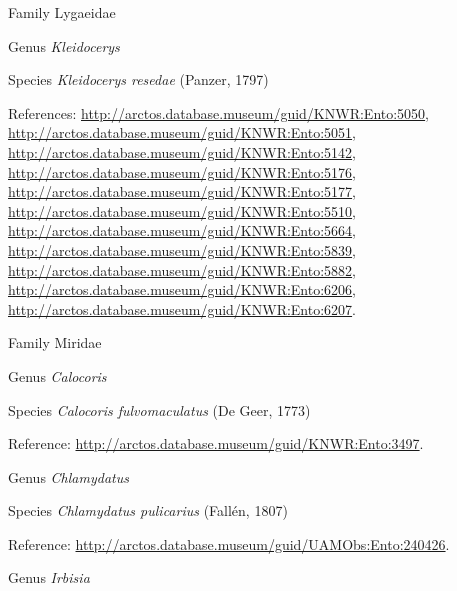 \documentclass[9pt, article]{memoir}
\begin{document}
\begin{multicols}{2}
\vspace{6pt}\noindent\hspace{24pt}Family Lygaeidae


\vspace{6pt}\noindent\hspace{30pt}Genus \textit{Kleidocerys}


\vspace{6pt}\noindent\hspace{36pt}Species \textit{Kleidocerys resedae} (Panzer, 1797)


\vspace{6pt}References: 
\url{http://arctos.database.museum/guid/KNWR:Ento:5050}, 
\url{http://arctos.database.museum/guid/KNWR:Ento:5051}, 
\url{http://arctos.database.museum/guid/KNWR:Ento:5142}, 
\url{http://arctos.database.museum/guid/KNWR:Ento:5176}, 
\url{http://arctos.database.museum/guid/KNWR:Ento:5177}, 
\url{http://arctos.database.museum/guid/KNWR:Ento:5510}, 
\url{http://arctos.database.museum/guid/KNWR:Ento:5664}, 
\url{http://arctos.database.museum/guid/KNWR:Ento:5839}, 
\url{http://arctos.database.museum/guid/KNWR:Ento:5882}, 
\url{http://arctos.database.museum/guid/KNWR:Ento:6206}, 
\url{http://arctos.database.museum/guid/KNWR:Ento:6207}.

\vspace{6pt}\noindent\hspace{24pt}Family Miridae


\vspace{6pt}\noindent\hspace{30pt}Genus \textit{Calocoris}


\vspace{6pt}\noindent\hspace{36pt}Species \textit{Calocoris fulvomaculatus} (De Geer, 1773)


\vspace{6pt}Reference: 
\url{http://arctos.database.museum/guid/KNWR:Ento:3497}.

\vspace{6pt}\noindent\hspace{30pt}Genus \textit{Chlamydatus}


\vspace{6pt}\noindent\hspace{36pt}Species \textit{Chlamydatus pulicarius} (Fallén, 1807)


\vspace{6pt}Reference: 
\url{http://arctos.database.museum/guid/UAMObs:Ento:240426}.

\vspace{6pt}\noindent\hspace{30pt}Genus \textit{Irbisia}



\end{multicols}
\end{document}
